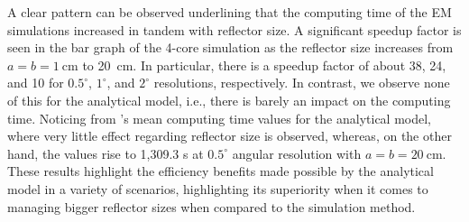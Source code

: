A clear pattern can be observed underlining that the computing time of the EM simulations increased in tandem with reflector size. A significant speedup factor is seen in the bar graph of the \num{4}-core simulation as the reflector size increases from $a=b=\SI{1}{\centi\meter}$ to \SI{20}{\centi\meter}. In particular, there is a speedup factor of about \num{38}, \num{24}, and \num{10} for $\num{0.5}^\circ$, $\num{1}^\circ$, and $\num{2}^\circ$ resolutions, respectively. In contrast, we observe none of this for the analytical model, i.e., there is barely an impact on the computing time. Noticing from 's mean computing time values for the analytical model, where very little effect regarding reflector size is observed, whereas, on the other hand, the values rise to 1,309.3 \si{\second} at $\num{0.5}^\circ$ angular resolution with $a=b=\SI{20}{\centi\meter}$. These results highlight the efficiency benefits made possible by the analytical model in a variety of scenarios, highlighting its superiority when it comes to managing bigger reflector sizes when compared to the simulation method.
